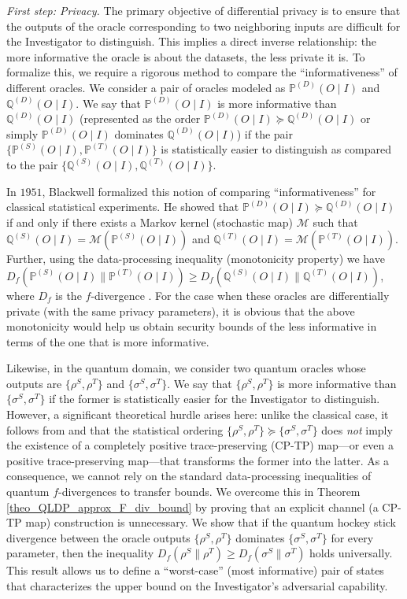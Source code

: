 \documentclass[onecolumn,ldraftcls, 11pt]{IEEEtran}
\newcommand*{\bbP}{\mathbb{P}}
\newcommand*{\bbQ}{\mathbb{Q}}
\newcommand*{\cM}{\mathcal{M}}
\begin{document}
{\em First step: Privacy.}
The primary objective of differential privacy is to ensure that the outputs of the oracle corresponding to two neighboring inputs are difficult for the Investigator to distinguish. This implies a direct inverse relationship: the more informative the oracle is about the datasets, the less private it is. To formalize this, we require a rigorous method to compare the ``informativeness'' of different oracles. We consider a pair of oracles modeled as $\bbP^{(D)}(O\mid I)$ and $\bbQ^{(D)}(O\mid I)$. We say that $\bbP^{(D)}(O\mid I)$ is more informative than $\bbQ^{(D)}(O\mid I)$ (represented as the order $\bbP^{(D)}(O\mid I) \succeq \bbQ^{(D)}(O\mid I)$ or simply $\bbP^{(D)}(O\mid I)$ dominates $\bbQ^{(D)}(O\mid I)$) if the pair $\{\bbP^{(S)}(O\mid I),\bbP^{(T)}(O\mid I)\}$ is statistically easier to  distinguish as compared to the pair $\{\bbQ^{(S)}(O\mid I),\bbQ^{(T)}(O\mid I)\}$.


In $1951$, Blackwell \cite{Blackwell51,BG54} formalized this notion of comparing ``informativeness'' for classical statistical experiments. He showed that $\bbP^{(D)}(O\mid I) \succeq \bbQ^{(D)}(O\mid I)$ if and only if there exists a Markov kernel (stochastic map) $\cM$ such that $\bbQ^{(S)}(O\mid I) = \cM(\bbP^{(S)}(O\mid I))$ and $\bbQ^{(T)}(O\mid I) = \cM(\bbP^{(T)}(O\mid I))$. Further, using the data-processing inequality (monotonicity property) we have $D_{f}(\bbP^{(S)}(O\mid I)\| \bbP^{(T)}(O\mid I)) \geq D_{f}(\bbQ^{(S)}(O\mid I)\| \bbQ^{(T)}(O\mid I))$, where $D_f$ is the $f$-divergence \cite{Sason_2016}. For the case when these oracles are differentially private (with the same privacy parameters), it is obvious that the above monotonicity would help us obtain security bounds of the less informative in terms of the one that is more informative.

Likewise, in the quantum domain, we consider two quantum oracles whose outputs are $\{\rho^{S},\rho^{T}\}$ and $\{\sigma^{S},\sigma^{T}\}$. We say that $\{\rho^{S},\rho^{T}\}$ is more informative than $\{\sigma^{S},\sigma^{T}\}$ if the former is statistically easier for the Investigator to distinguish. However, a significant theoretical hurdle arises here: unlike the classical case, it follows from \cite{GLW24} and \cite{Matsumoto2014} that the statistical ordering $\{\rho^{S},\rho^{T}\} \succeq \{\sigma^{S},\sigma^{T}\}$ does \emph{not} imply the existence of a completely positive trace-preserving (CP-TP) map---or even a positive trace-preserving map---that transforms the former into the latter. As a consequence, we cannot rely on the standard data-processing inequalities of quantum $f$-divergences \cite{Hirche_2024} to transfer bounds. We overcome this in Theorem \ref{theo_QLDP_approx_F_div_bound} by proving that an explicit channel (a CP-TP map) construction is unnecessary. We show that if the quantum hockey stick divergence \cite{Sharma09} between the oracle outputs $\{\rho^{S},\rho^{T}\}$ dominates $\{\sigma^{S},\sigma^{T}\}$ for every parameter, then the inequality $D_{f}(\rho^{S}\|\rho^{T}) \geq D_{f}(\sigma^{S}\|\sigma^{T})$ holds universally. This result allows us to define a ``worst-case'' (most informative) pair of states that characterizes the upper bound on the Investigator's adversarial capability.
\end{document}
